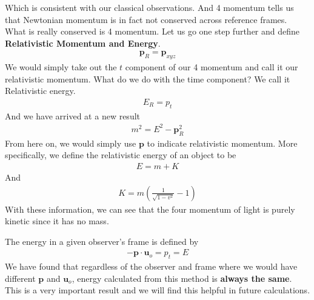 \documentclass[12pt]{book}
\newcommand{\paren}[1]{\left( #1 \right)}
\begin{document}
Which is consistent with our classical observations. And 4 momentum tells us that Newtonian momentum is in fact not conserved across reference frames. What is really conserved is 4 momentum. Let us go one step further and define \textbf{Relativistic Momentum and Energy}.
\begin{align}
\mathbf{p}_R = \mathbf{p}_{xyz} 
\end{align}
We would simply take out the $t$ component of our 4 momentum and call it our relativistic momentum. What do we do with the time component? We call it Relativistic energy.
\begin{align}
E_R = p_t
\end{align}
And we have arrived at a new result
\begin{align}
m^2 = E^2 - \mathbf{p}_R^2
\end{align}
From here on, we would simply use $\mathbf{p}$ to indicate relativistic momentum. More specifically, we define the relativistic energy of an object to be
\begin{align}
E = m + K
\end{align}
And 
\begin{align}
K = m\paren{\frac{1}{\sqrt{1-v^2}}-1}
\end{align}
With these information, we can see that the four momentum of light is purely kinetic since it has no mass. 

The energy in a given observer's frame is defined by
\begin{align}
-\mathbf{p}\cdot \mathbf{u}_{o} = p_t = E
\end{align}
We have found that regardless of the observer and frame where we would have different $\mathbf{p}$ and $\mathbf{u}_o$, energy calculated from this method is \textbf{always the same}. This is a very important result and we will find this helpful in future calculations. 







        
\end{document}
